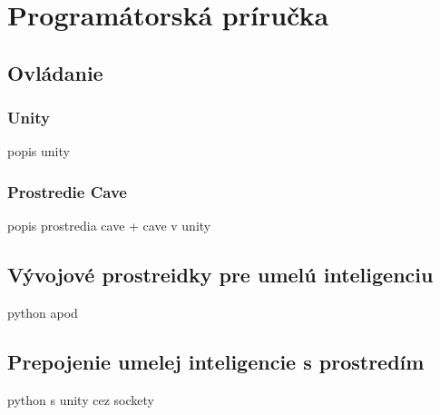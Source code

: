 \documentclass[12pt]{article}
\begin{document}
    
    
    
    
    
    \section{Programátorská príručka}\label{sec:programming}
    \subsection{Ovládanie}\label{subsec:controlling}
    \subsubsection{Unity}
    popis unity
    \subsubsection{Prostredie Cave}
    popis prostredia cave + cave v unity
    \subsection{Vývojové prostreidky pre umelú inteligenciu}\label{subsec:dev-tools-for-ai}
    python apod
    \subsection{Prepojenie umelej inteligencie s prostredím}\label{subsec:connection}
    python s unity cez sockety

    
    
\end{document}
